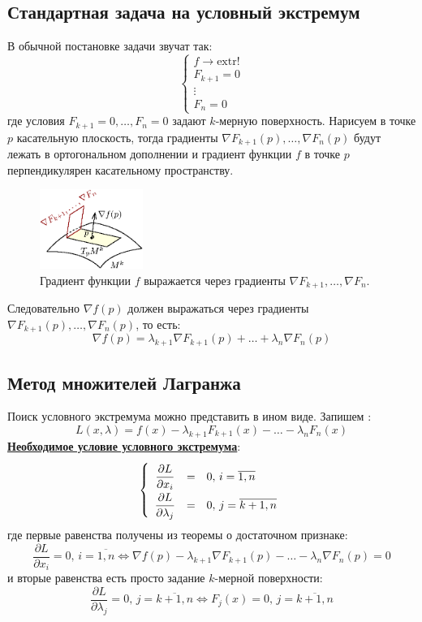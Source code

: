 \documentclass[12pt]{article}
\theoremstyle{definition}
\begin{document}
\subsection*{Стандартная задача на условный экстремум}
В обычной постановке задачи звучат так:
$$
	\left\{
	\begin{array}{c}
		f \to \text{extr}!\\
		F_{k+1} = 0 \\
		\vdots \\
		F_n = 0	
	\end{array}
	\right.
$$
где условия $F_{k+1} = 0, \dotsc, F_n = 0$ задают $k$-мерную поверхность. Нарисуем в точке $p$ касательную плоскость, тогда градиенты $\nabla F_{k+1}(p), \dotsc, \nabla F_n(p)$ будут лежать в ортогональном дополнении и градиент функции $f$ в точке $p$ перпендикулярен касательному пространству. 
\begin{figure}[H]
	\centering
	\includegraphics[width=0.3\textwidth]{20_6.eps}
	\caption{Градиент функции $f$ выражается через градиенты $\nabla  F_{k+1}, \dotsc, \nabla F_n$.}
	\label{20_6}
\end{figure}
Следовательно $\nabla f(p)$ должен выражаться через градиенты  $\nabla F_{k+1}(p), \dotsc, \nabla F_n(p)$, то есть:
$$
	\nabla f(p) = \lambda_{k+1} \nabla F_{k+1} (p) + \dotsc + \lambda_n \nabla F_n(p)
$$
\subsection*{Метод множителей Лагранжа}
Поиск условного экстремума можно представить в ином виде. Запишем :
$$
	L(x,\lambda) =f(x) - \lambda_{k+1} F_{k+1}(x) - \dotsc - \lambda_n F_n(x)
$$
\textbf{\uline{Необходимое условие условного экстремума}}:
$$
	\left\{
		\renewcommand\arraystretch{2}
		\begin{array}{ccl}
			\dfrac{\partial L}{\partial x_i} & = & 0, \, i = \overline{1, n}\\
			\dfrac{\partial L}{\partial \lambda_j} & = & 0, \, j = \overline{k+1,n}
		\end{array}
	\right.
$$
где первые равенства получены из теоремы о достаточном признаке:
$$
	\dfrac{\partial L}{\partial x_i}  =  0, \, i = \overline{1, n} \Leftrightarrow \nabla f(p) - \lambda_{k+1} \nabla F_{k+1} (p) - \dotsc - \lambda_n \nabla F_n(p) = 0
$$
и вторые равенства есть просто задание $k$-мерной поверхности:
$$
	\dfrac{\partial L}{\partial \lambda_j} =  0, \, j = \overline{k+1,n} \Leftrightarrow F_j(x) = 0, \, j = \overline{k+1,n}
$$
\end{document}
